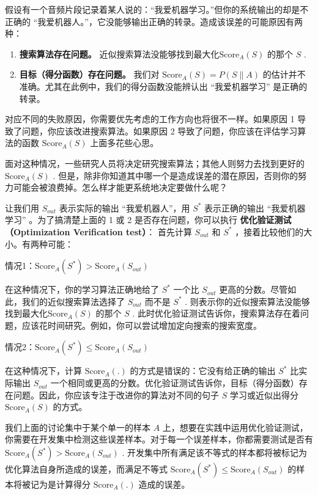 假设有一个音频片段记录着某人说的：``我爱机器学习。''但你的系统输出的却是不正确的
``我爱机器人。''，它没能够输出正确的转录。造成该误差的可能原因有两种：

\begin{enumerate}
\def\labelenumi{\arabic{enumi}.}
\tightlist
\item
  \textbf{搜索算法存在问题。}
  近似搜索算法没能够找到最大化\(\text{Score}_A(S)\) 的那个 \(S\) .
\item
  \textbf{目标（得分函数）存在问题。} 我们对
  \(\text{Score}_A (S)=P(S\|A)\)
  的估计并不准确。尤其在此例中，我们的得分函数没能辨认出
  ``我爱机器学习'' 是正确的转录。
\end{enumerate}

对应不同的失败原因，你需要优先考虑的工作方向也将很不一样。如果原因 1
导致了问题，你应该改进搜索算法。如果原因 2
导致了问题，你应该在评估学习算法的函数 \(\text{Score}_A(S)\)
上面多花些心思。

面对这种情况，一些研究人员将决定研究搜索算法；其他人则努力去找到更好的
\(\text{Score}_A(S)\) .
但是，除非你知道其中哪一个是造成误差的潜在原因，否则你的努力可能会被浪费掉。怎么样才能更系统地决定要做什么呢？

让我们用 \(S_{out}\) 表示实际的输出 ``我爱机器人''，用 \(S^*\)
表示正确的输出 ``我爱机器学习'' 。为了搞清楚上面的 1 或 2
是否存在问题，你可以执行 \textbf{优化验证测试（Optimization Verification
test）}： 首先计算 \(S_{out}\) 和 \(S^*\)
，接着比较他们的大小。有两种可能：

情况1：\(\text{Score}_A {(S^*)} \gt \text{Score}_A {(S_{out})}\)

在这种情况下，你的学习算法正确地给了 \(S^*\) 一个比 \(S_{out}\)
更高的分数。尽管如此，我们的近似搜索算法选择了 \(S_{out}\) 而不是
\(S^*\) . 则表示你的近似搜索算法没能够找到最大化\(\text{Score}_A(S)\)
的那个 \(S\) .
此时优化验证测试告诉你，搜索算法存在着问题，应该花时间研究。例如，你可以尝试增加定向搜索的搜索宽度。

情况2：\(\text{Score}_A (S^*) \leq \text{Score}_A (S_{out})\)

在这种情况下，计算 \(\text{Score}_A (.)\)
的方式是错误的：它没有给正确的输出 \(S^*\) 比实际输出 \(S_{out}\)
一个相同或更高的分数。优化验证测试告诉你，目标（得分函数）存在问题。因此，你应该专注于改进你的算法对不同的句子
\(S\) 学习或近似出得分 \(\text{Score}_A (S)\) 的方式。

我们上面的讨论集中于某个单一的样本 \(A\)
上，想要在实践中运用优化验证测试，你需要在开发集中检测这些误差样本。对于每一个误差样本，你都需要测试是否有
\(\text{Score}_A (S^*) \gt \text{Score}_A(S_{out})\) .
开发集中所有满足该不等式的样本都将被标记为优化算法自身所造成的误差，而满足不等式
\(\text{Score}_A (S^*) \leq \text{Score}_A(S_{out})\)
的样本将被记为是计算得分 \(\text{Score}_A (.)\) 造成的误差。

